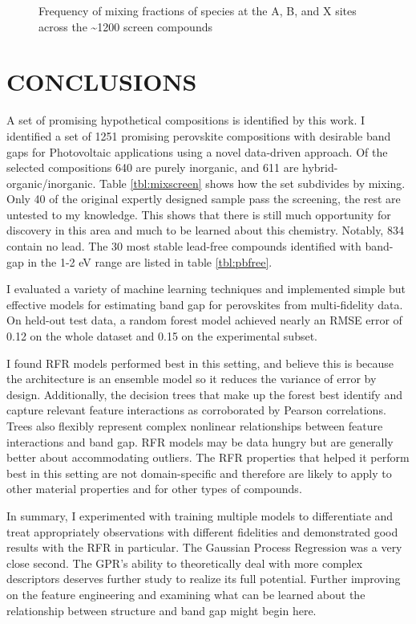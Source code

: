  
\begin{figure}[htbp]
\centering

\caption{\label{fig:freq} Frequency of mixing fractions of species at the A, B, and X sites across the \textasciitilde{}1200 screen compounds}
\end{figure}

\chapter{CONCLUSIONS}
\label{sec:orgbfd2f81}
A set of promising hypothetical compositions is identified by this work.
I identified a set of 1251 promising perovskite compositions with desirable band gaps for Photovoltaic applications using a novel data-driven approach.
Of the selected compositions 640 are purely inorganic, and 611 are hybrid-organic/inorganic.
Table \ref{tbl:mixscreen} shows how the set subdivides by mixing.
Only 40 of the original expertly designed sample pass the screening, the rest are untested to my knowledge.
This shows that there is still much opportunity for discovery in this area and much to be learned about this chemistry.
Notably, 834 contain no lead.
The 30 most stable lead-free compounds identified with band-gap in the 1-2 \unit{\electronvolt} range are listed in table \ref{tbl:pbfree}.

I evaluated a variety of machine learning techniques and implemented simple but effective models for estimating band gap for perovskites from multi-fidelity data.
On held-out test data, a random forest model achieved nearly an RMSE error of 0.12 on the whole dataset and 0.15 on the experimental subset.

I found RFR models performed best in this setting, and believe this is because the architecture is an ensemble model so it reduces the variance of error by design.
Additionally, the decision trees that make up the forest best identify and capture relevant feature interactions as corroborated by Pearson correlations.
Trees also flexibly represent complex nonlinear relationships between feature interactions and band gap.
RFR models may be data hungry but are generally better about accommodating outliers.
The RFR properties that helped it perform best in this setting are not domain-specific and therefore are likely to apply to other material properties and for other types of compounds.

In summary, I experimented with training multiple models to differentiate and treat appropriately observations with different fidelities and demonstrated good results with the RFR in particular.
The Gaussian Process Regression was a very close second.
The GPR’s ability to theoretically deal with more complex descriptors deserves further study to realize its full potential.
Further improving on the feature engineering and examining what can be learned about the relationship between structure and band gap might begin here.

